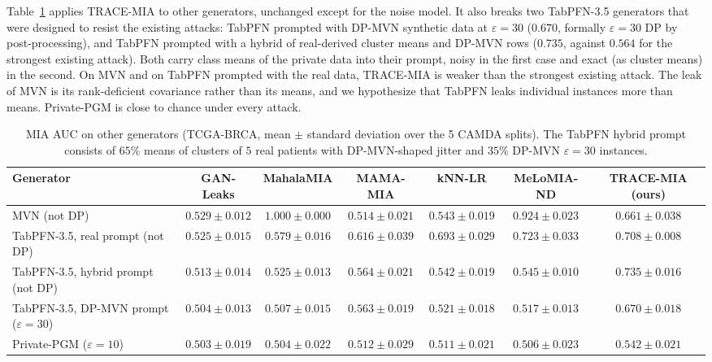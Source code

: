 \documentclass{article}
\newcommand{\dpmvn}{DP-MVN}
\newcommand{\ours}{TRACE-MIA}
\begin{document}
Table~\ref{tab:results-other} applies \ours{} to other generators, unchanged except for the noise model. It also breaks two TabPFN-3.5 generators that were designed to resist the existing attacks: TabPFN prompted with \dpmvn{} synthetic data at $\varepsilon=30$ ($0.670$, formally $\varepsilon=30$ DP by post-processing), and TabPFN prompted with a hybrid of real-derived cluster means and \dpmvn{} rows ($0.735$, against $0.564$ for the strongest existing attack). Both carry class means of the private data into their prompt, noisy in the first case and exact (as cluster means) in the second. On MVN and on TabPFN prompted with the real data, \ours{} is weaker than the strongest existing attack. The leak of MVN is its rank-deficient covariance rather than its means, and we hypothesize that TabPFN leaks individual instances more than means. Private-PGM \cite{mckenna2019graphical} is close to chance under every attack.

\begin{table}[!h]
\centering
\caption{MIA AUC on other generators (TCGA-BRCA, mean $\pm$ standard deviation over the 5 CAMDA splits). The TabPFN hybrid prompt consists of $65\%$ means of clusters of $5$ real patients with \dpmvn{}-shaped jitter and $35\%$ \dpmvn{} $\varepsilon=30$ instances.}
\label{tab:results-other}
\small
\begin{tabular}{lcccccc}
\toprule
Generator & GAN-Leaks & MahalaMIA & MAMA-MIA & kNN-LR & MeLoMIA-ND & \ours{} (ours) \\
\midrule
MVN (not DP)                              & $0.529\pm0.012$ & $\mathbf{1.000\pm0.000}$ & $0.514\pm0.021$ & $0.543\pm0.019$ & $0.924\pm0.023$ & $0.661\pm0.038$ \\
TabPFN-3.5, real prompt (not DP)          & $0.525\pm0.015$ & $0.579\pm0.016$ & $0.616\pm0.039$ & $0.693\pm0.029$ & $\mathbf{0.723\pm0.033}$ & $0.708\pm0.008$ \\
TabPFN-3.5, hybrid prompt (not DP)        & $0.513\pm0.014$ & $0.525\pm0.013$ & $0.564\pm0.021$ & $0.542\pm0.019$ & $0.545\pm0.010$ & $\mathbf{0.735\pm0.016}$ \\
TabPFN-3.5, \dpmvn{} prompt ($\varepsilon=30$) & $0.504\pm0.013$ & $0.507\pm0.015$ & $0.563\pm0.019$ & $0.521\pm0.018$ & $0.517\pm0.013$ & $\mathbf{0.670\pm0.018}$ \\
Private-PGM ($\varepsilon=10$)            & $0.503\pm0.019$ & $0.504\pm0.022$ & $0.512\pm0.029$ & $0.511\pm0.021$ & $0.506\pm0.023$ & $\mathbf{0.542\pm0.021}$ \\
\bottomrule
\end{tabular}
\end{table}
\end{document}
